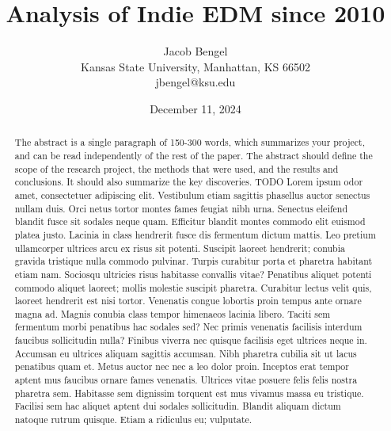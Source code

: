\documentclass[article,pdftex,12pt,a4paper]{article}
\begin{document}
\title{Analysis of Indie EDM since 2010}

\author{Jacob Bengel \\ \small Kansas State University, Manhattan, KS 66502 \\ \small jbengel@ksu.edu}

\date{December 11, 2024}

\maketitle

\begin{abstract}
The abstract is a single paragraph of 150-300 words, which summarizes your project, and can be read independently of the rest of the paper. The abstract should define the scope of the research project, the methods that were used, and the results and conclusions. It should also summarize the key discoveries. TODO Lorem ipsum odor amet, consectetuer adipiscing elit. Vestibulum etiam sagittis phasellus auctor senectus nullam duis. Orci netus tortor montes fames feugiat nibh urna. Senectus eleifend blandit fusce sit sodales neque quam. Efficitur blandit montes commodo elit euismod platea justo. Lacinia in class hendrerit fusce dis fermentum dictum mattis. Leo pretium ullamcorper ultrices arcu ex risus sit potenti. Suscipit laoreet hendrerit; conubia gravida tristique nulla commodo pulvinar. Turpis curabitur porta et pharetra habitant etiam nam. Sociosqu ultricies risus habitasse convallis vitae? Penatibus aliquet potenti commodo aliquet laoreet; mollis molestie suscipit pharetra. Curabitur lectus velit quis, laoreet hendrerit est nisi tortor. Venenatis congue lobortis proin tempus ante ornare magna ad. Magnis conubia class tempor himenaeos lacinia libero. Taciti sem fermentum morbi penatibus hac sodales sed? Nec primis venenatis facilisis interdum faucibus sollicitudin nulla? Finibus viverra nec quisque facilisis eget ultrices neque in. Accumsan eu ultrices aliquam sagittis accumsan. Nibh pharetra cubilia sit ut lacus penatibus quam et. Metus auctor nec nec a leo dolor proin. Inceptos erat tempor aptent mus faucibus ornare fames venenatis. Ultrices vitae posuere felis felis nostra pharetra sem. Habitasse sem dignissim torquent est mus vivamus massa eu tristique. Facilisi sem hac aliquet aptent dui sodales sollicitudin. Blandit aliquam dictum natoque rutrum quisque. Etiam a ridiculus eu; vulputate.
\end{abstract}
\end{document}
